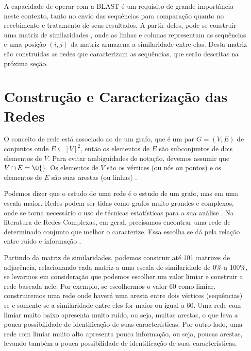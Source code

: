 
A capacidade de operar com a BLAST é um requisito de grande importância neste contexto, tanto no envio das sequências para comparação quanto no recebimento
e tratamento de seus resultados. A partir deles, pode-se construir uma matriz de similaridades \cite{andrade2006}, onde as linhas e colunas representam as
sequências e uma posição $(i, j)$ da matriz armazena a similaridade entre elas. Desta matriz são construídas as redes que caracterizam as sequências, que
serão descritas na próxima seção.

\section{Construção e Caracterização das Redes} \label{sec:conscarac}

O conceito de rede está associado ao de um grafo, que é um par $G = (V, E)$ de conjuntos onde $E \subseteq [V]^2$, então os elementos de $E$
são subconjuntos de dois elementos de $V$. Para evitar ambiguidades de notação, devemos assumir que $V \cap E = \O{}$. Os elementos de $V$ são os vértices
(ou nós ou pontos) e os elementos de $E$ são suas arestas (ou linhas) \cite{reinhard2010}.

Podemos dizer que o estudo de uma rede é o estudo de um grafo, mas em uma escala maior. Redes podem ser tidas como grafos muito grandes e complexos,
onde se torna necessário o uso de técnicas estatísticas para a sua análise \cite{bessa2008}. Na literatura de Redes Complexas, em geral, precisamos
encontrar uma rede de determinado conjunto que melhor o caracterize. Essa escolha se dá pela relação entre ruído e informação \cite{barabasi2004}.

Partindo da matriz de similaridades, podemos construir até 101 matrizes de adjacência, relacionando cada matriz a uma escala de similaridade
de 0\% a 100\%, se levarmos
em consideração que podemos escolher um valor limiar e construir a rede baseada nele. Por exemplo, se escolhermos o valor 60 como limiar, construiremos uma
rede onde haverá uma aresta entre dois vértices (sequências) se e somente se a similaridade entre eles for maior ou igual a 60. Uma rede com limiar
muito baixo apresenta muito ruído, ou seja, muitas arestas, o que leva a pouca possibilidade de identificação de suas características. Por outro lado, uma
rede com limiar muito alto apresenta pouca informação, ou seja, poucas arestas, levando também a pouca possibilidade de identificação de suas características.

